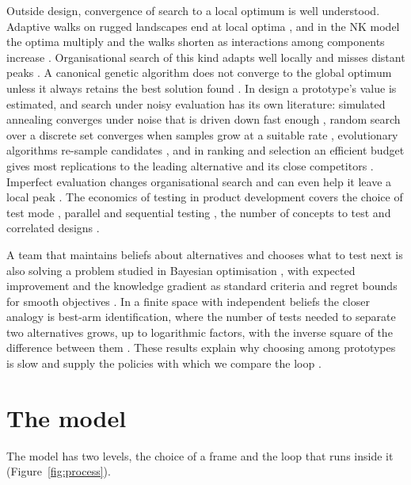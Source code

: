 \documentclass[preprint,review,11pt,authoryear]{elsarticle}
\theoremstyle{definition}
\begin{document}
Outside design, convergence of search to a local optimum is well understood. Adaptive walks on rugged landscapes end at local optima \citep{kauffmanlevin1987}, and in the NK model the optima multiply and the walks shorten as interactions among components increase \citep{kauffmanweinberger1989, kauffman1993}. Organisational search of this kind adapts well locally and misses distant peaks \citep{levinthal1997, levinthalmarch1993, march1991}. A canonical genetic algorithm does not converge to the global optimum unless it always retains the best solution found \citep{rudolph1994}. In design a prototype's value is estimated, and search under noisy evaluation has its own literature: simulated annealing converges under noise that is driven down fast enough \citep{gutjahr1996}, random search over a discrete set converges when samples grow at a suitable rate \citep{homem2003}, evolutionary algorithms re-sample candidates \citep{jin2005}, and in ranking and selection an efficient budget gives most replications to the leading alternative and its close competitors \citep{chen2000}. Imperfect evaluation changes organisational search and can even help it leave a local peak \citep{knudsen2007}. The economics of testing in product development covers the choice of test mode \citep{thomke1998}, parallel and sequential testing \citep{loch2001}, the number of concepts to test \citep{dahan2001} and correlated designs \citep{erat2008}.

A team that maintains beliefs about alternatives and chooses what to test next is also solving a problem studied in Bayesian optimisation \citep{jones1998, shahriari2016}, with expected improvement and the knowledge gradient \citep{frazier2008, frazier2009} as standard criteria and regret bounds for smooth objectives \citep{srinivas2012}. In a finite space with independent beliefs the closer analogy is best-arm identification, where the number of tests needed to separate two alternatives grows, up to logarithmic factors, with the inverse square of the difference between them \citep{evendar2006, mannor2004, audibert2010}. These results explain why choosing among prototypes is slow and supply the policies with which we compare the loop \citep{auer2002, russo2018}.

\section{The model}
\label{sec:model}

The model has two levels, the choice of a frame and the loop that runs inside it (Figure~\ref{fig:process}).
\end{document}

